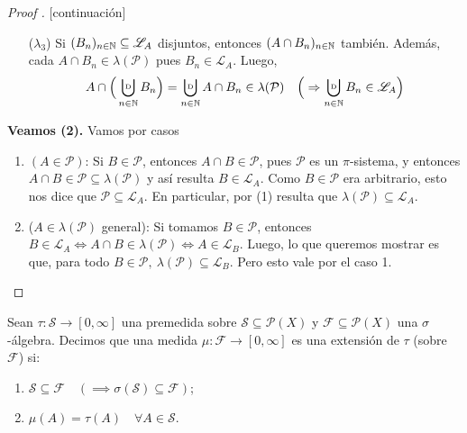 \begin{proof}[Proof ][continuación]
\begin{enumerate}
		\item[($\lambda_{3}$)] Si $(B_n)_{n\in\mathbb{N}} \subseteq \mathscr{L}_A$ disjuntos, entonces $(A \cap B_n)_{n\in\mathbb{N}}$ también. Además, cada $A \cap B_n \in \lambda(\mathcal{P})$ pues $B_n \in \mathscr{L}_A$. Luego,
		\[ A \cap \Big( \bigcupd_{n\in\N} B_n \Big) = \bigcupd_{n\in\N} A \cap B_n \in \lambda(\mathcal{P}) \quad \Big(\implies \bigcupd_{n\in\N} B_n \in \mathscr{L}_A\Big) \]
	\end{enumerate}
	\textbf{Veamos (2).} Vamos por casos
	\begin{enumerate}
		\item $(A \in \mathcal{P})$: Si $B \in \mathcal{P}$, entonces $A \cap B \in \mathcal{P}$, pues $\mathcal{P}$ es un $\pi$-sistema, y entonces $A \cap B \in \mathcal{P} \subseteq \lambda(\mathcal{P})$ y así resulta $B \in \mathscr{L}_A$. Como $B \in \mathcal{P}$ era arbitrario, esto nos dice que $\mathcal{P} \subseteq \mathscr{L}_A$. En particular, por (1) resulta que $\lambda(\mathcal{P}) \subseteq \mathscr{L}_A$.

		\item ($A \in \lambda(\mathcal{P})$ general): Si tomamos $B \in \mathcal{P}$, entonces $B \in \mathscr{L}_A \iff A \cap B \in \lambda(\mathscr{P}) \iff A \in \mathscr{L}_B$. Luego, lo que queremos mostrar es que, para todo $B \in \mathcal{P},\ \lambda(\mathcal{P}) \subseteq \mathscr{L}_B$. Pero esto vale por el caso 1. \checkmark
	\end{enumerate}
\end{proof}

\begin{definition}
	Sean $\tau : \mathscr{S} \to [0,\infty]$ una premedida sobre $\mathscr{S} \subseteq \mathcal{P}(X)$ y $\mathcal{F} \subseteq \mathcal{P}(X)$ una $\sigma$-álgebra. Decimos que una medida $\mu: \mathcal{F} \to [0,\infty]$ es una extensión de $\tau$ (sobre $\mathcal{F}$) si:
	\begin{enumerate}
		\item $\mathscr{S} \subseteq \mathcal{F} \quad (\implies \sigma(\mathscr{S}) \subseteq \mathcal{F})$;

		\item $\mu(A) = \tau(A) \quad \forall A \in \mathscr{S}$.
	\end{enumerate}
\end{definition}

